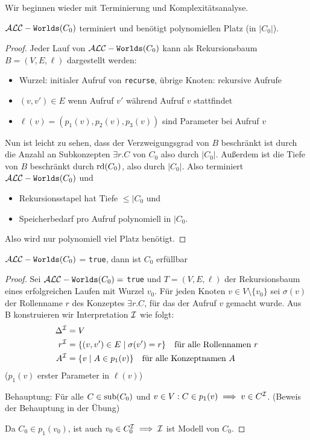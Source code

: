 Wir beginnen wieder mit Terminierung und Komplexitätsanalyse.

\begin{lemma}
    $\mathcal{A}\mathcal{L}\mathcal{C}-\texttt{Worlds}(C_0)$ terminiert und benötigt polynomiellen Platz (in $|C_0|$).
\end{lemma}

\begin{proof}
    Jeder Lauf von $\mathcal{A}\mathcal{L}\mathcal{C}-\texttt{Worlds}(C_0)$ kann als Rekursionsbaum $B = (V, E, \ell)$ dargestellt werden:
    \begin{itemize}
        \item Wurzel: initialer Aufruf von \texttt{recurse}, übrige Knoten: rekursive Aufrufe
        \item $(v, v') \in E$ wenn Aufruf $v'$ während Aufruf $v$ stattfindet
        \item $\ell(v) = (p_1(v), p_2(v), p_3(v))$ sind Parameter bei Aufruf $v$
    \end{itemize}
    Nun ist leicht zu sehen, dass der Verzweigungsgrad von $B$ beschränkt ist durch die Anzahl an Subkonzepten $\exists r.C$ von $C_0$ also durch $|C_0|$. Außerdem ist die Tiefe von $B$ beschränkt durch $\operatorname{rd}(C_0)$, also durch $|C_0|$.
    Also terminiert $\mathcal{A}\mathcal{L}\mathcal{C}-\texttt{Worlds}(C_0)$ und
    \begin{itemize}
        \item Rekursionsstapel hat Tiefe $\leq |C_0$ und
        \item Speicherbedarf pro Aufruf polynomiell in $|C_0$.
    \end{itemize}
    Also wird nur polynomiell viel Platz benötigt.
\end{proof}

\begin{lemma}
    $\mathcal{A}\mathcal{L}\mathcal{C}-\texttt{Worlds}(C_0)$ = \texttt{true}, dann ist $C_0$ erfüllbar
\end{lemma}

\begin{proof}
    Sei $\mathcal{A}\mathcal{L}\mathcal{C}-\texttt{Worlds}(C_0) = $ \texttt{true} und $T = (V, E, \ell)$ der Rekursionsbaum eines erfolgreichen Laufen mit Wurzel $v_0$. Für jeden Knoten $v \in V \setminus \{v_0\}$ sei $\sigma(v)$ der Rollenname $r$ des Konzeptes $\exists r.C$, für das der Aufruf $v$ gemacht wurde. Aus B konstruieren wir Interpretation $\mathcal{I}$ wie folgt:
    \begin{align*}
        \Delta^{\mathcal{I}} &= V\\
        r^{\mathcal{I}} &= \{(v, v') \in E \mid \sigma(v') = r\} \quad \text{für alle Rollennamen } r\\
        A^{\mathcal{I}} &= \{v \mid A \in p_1(v)\} \quad \text{für alle Konzeptnamen } A\\
    \end{align*}
    ($p_1(v)$ erster Parameter in $\ell(v)$)

    Behauptung: Für alle $C \in \operatorname{sub}(C_0)$ und $v \in V : C \in p_1(v) \implies v \in C^{\mathcal{I}}$. (Beweis der Behauptung in der Übung)

    Da $C_0 \in p_1(v_0)$, ist auch $v_0 \in C_0^{\mathcal{I}} \implies \mathcal{I}$ ist Modell von $C_0$.
\end{proof}


